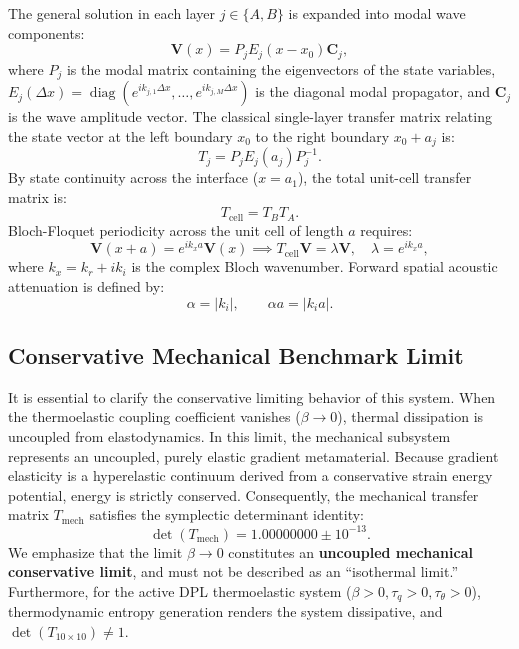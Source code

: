 \documentclass[11pt,a4paper]{article}
\begin{document}
The general solution in each layer $j \in \{A, B\}$ is expanded into modal wave components:
\begin{equation}
\mathbf{V}(x) = P_j E_j(x - x_0) \mathbf{C}_j,
\label{eq:modal_expansion}
\end{equation}
where $P_j$ is the modal matrix containing the eigenvectors of the state variables, $E_j(\Delta x) = \operatorname{diag}\left( e^{i k_{j,1} \Delta x}, \dots, e^{i k_{j,M} \Delta x} \right)$ is the diagonal modal propagator, and $\mathbf{C}_j$ is the wave amplitude vector. The classical single-layer transfer matrix relating the state vector at the left boundary $x_0$ to the right boundary $x_0 + a_j$ is:
\begin{equation}
T_j = P_j E_j(a_j) P_j^{-1}.
\label{eq:transfer_matrix_single}
\end{equation}
By state continuity across the interface ($x = a_1$), the total unit-cell transfer matrix is:
\begin{equation}
T_{\text{cell}} = T_B T_A.
\label{eq:tcell}
\end{equation}
Bloch-Floquet periodicity across the unit cell of length $a$ requires:
\begin{equation}
\mathbf{V}(x + a) = e^{i k_x a} \mathbf{V}(x) \implies T_{\text{cell}} \mathbf{V} = \lambda \mathbf{V}, \quad \lambda = e^{i k_x a},
\label{eq:bloch_secular}
\end{equation}
where $k_x = k_r + i k_i$ is the complex Bloch wavenumber. Forward spatial acoustic attenuation is defined by:
\begin{equation}
\alpha = |k_i|, \qquad \alpha a = |k_i a|.
\label{eq:attenuation_def}
\end{equation}

\subsection{Conservative Mechanical Benchmark Limit}
It is essential to clarify the conservative limiting behavior of this system. When the thermoelastic coupling coefficient vanishes ($\beta \to 0$), thermal dissipation is uncoupled from elastodynamics. In this limit, the mechanical subsystem represents an uncoupled, purely elastic gradient metamaterial. Because gradient elasticity is a hyperelastic continuum derived from a conservative strain energy potential, energy is strictly conserved. Consequently, the mechanical transfer matrix $T_{\text{mech}}$ satisfies the symplectic determinant identity:
\begin{equation}
\det(T_{\text{mech}}) = 1.00000000 \pm 10^{-13}.
\label{eq:symplectic_identity}
\end{equation}
We emphasize that the limit $\beta \to 0$ constitutes an \textbf{uncoupled mechanical conservative limit}, and must not be described as an ``isothermal limit.'' Furthermore, for the active DPL thermoelastic system ($\beta > 0, \tau_q > 0, \tau_\theta > 0$), thermodynamic entropy generation renders the system dissipative, and $\det(T_{10\times 10}) \ne 1$.
\end{document}
